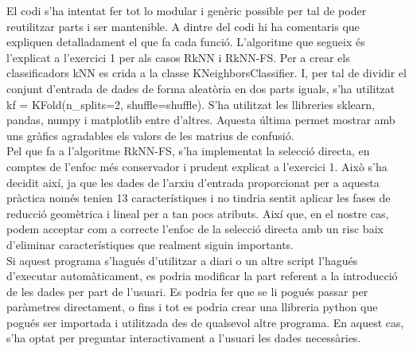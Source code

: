 \documentclass{article} %
\begin{document}
{	El codi s'ha intentat fer tot lo modular i genèric possible per tal de poder reutilitzar parts i ser mantenible. A dintre del codi hi ha comentaris que expliquen detalladament el que fa cada funció. L'algoritme que segueix és l'explicat a l'exercici 1 per als casos RkNN i RkNN-FS. Per a crear els classificadors kNN es crida a la classe {\selectfont\small KNeighborsClassifier}. I, per tal de dividir el conjunt d'entrada de dades de forma aleatòria en dos parts iguals, s'ha utilitzat {\selectfont\small kf = KFold(n\_splits=2, shuffle=shuffle)}. S'ha utilitzat les llibreries {\selectfont\small sklearn}, {\selectfont\small pandas}, {\selectfont\small numpy} i {\selectfont\small matplotlib} entre d'altres. Aquesta última permet mostrar amb uns gràfics agradables els valors de les matrius de confusió.\\

	Pel que fa a l'algoritme RkNN-FS, s'ha implementat la selecció directa, en comptes de l'enfoc més conservador i prudent explicat a l'exercici 1. Això s'ha decidit així, ja que les dades de l'arxiu d'entrada proporcionat per a aquesta pràctica només tenien 13 característiques i no tindria sentit aplicar les fases de reducció geomètrica i lineal per a tan pocs atributs. Així que, en el nostre cas, podem acceptar com a correcte l'enfoc de la selecció directa amb un risc baix d'eliminar característiques que realment siguin importants. \\

	Si aquest programa s'hagués d'utilitzar a diari o un altre script l'hagués d'executar automàticament, es podria modificar la part referent a la introducció de les dades per part de l'usuari. Es podria fer que se li pogués passar per paràmetres directament, o fins i tot es podria crear una llibreria python que pogués ser importada i utilitzada des de qualsevol altre programa. En aquest cas, s'ha optat per preguntar interactivament a l'usuari les dades necessàries.\\

}
\end{document}

